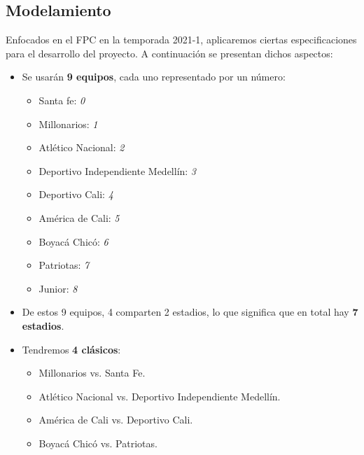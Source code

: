 \documentclass[11pt]{article}
\begin{document}
\begin{multicols}{2}
        \section{Modelamiento}
            Enfocados en el FPC en la temporada 2021-1, aplicaremos ciertas especificaciones para el desarrollo del proyecto. A continuación se presentan dichos aspectos:
            \begin{itemize}
                \item  Se usarán \textbf{9 equipos}, cada uno representado por un número:
                \begin{itemize}[label=$\diamond$]
                    \item Santa fe: \textit{0}
                    \item Millonarios: \textit{1}
                    \item Atlético Nacional: \textit{2}
                    \item Deportivo Independiente Medellín: \textit{3}
                    \item Deportivo Cali: \textit{4}
                    \item América de Cali: \textit{5}
                    \item Boyacá Chicó: \textit{6}
                    \item Patriotas: \textit{7}
                    \item Junior: \textit{8}
                \end{itemize}  
                \item  De estos 9 equipos, 4 comparten 2 estadios, lo que significa que en total hay \textbf{7 estadios}.
                \item  Tendremos \textbf{4 clásicos}:
                \begin{itemize}[label=$\diamond$]
                    \item  Millonarios vs. Santa Fe.
                    \item  Atlético Nacional vs. Deportivo Independiente Medellín.
                    \item  América de Cali vs. Deportivo Cali.
                    \item  Boyacá Chicó vs. Patriotas.
                \end{itemize}
            \end{itemize}


\end{multicols}
\end{document}
